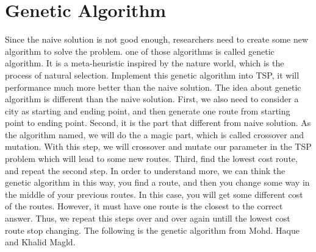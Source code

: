 \documentclass[a4paper,man,natbib]{apa6}
\begin{document}
\section{Genetic Algorithm}
Since the naive solution is not good enough, researchers need to create some new algorithm to solve the problem. one of those algorithms is called genetic algorithm. It is a meta-heuristic inspired by the nature world, which is the process of natural selection. Implement this genetic algorithm into TSP, it will performance much more better than the naive solution. The idea about genetic algorithm is different than the naive solution. First, we also need to consider a city as starting and ending point, and then generate one route from starting point to ending point. Second, it is the part that different from naive solution. As the algorithm named, we will do the a magic part, which is called crossover and mutation. With this step, we will crossover and mutate our parameter in the TSP problem which will lead to some new routes. Third, find the lowest cost route, and repeat the second step. In order to understand more, we can think the genetic algorithm in this way, you find a route, and then you change some way in the middle of your previous routes. In this case, you will get some different cost of the routes. However, it must have one route is the closest to the correct answer. Thus, we repeat this steps over and over again untill the lowest cost route stop changing. The following is the genetic algorithm from Mohd. Haque and Khalid Magld.
\end{document}
